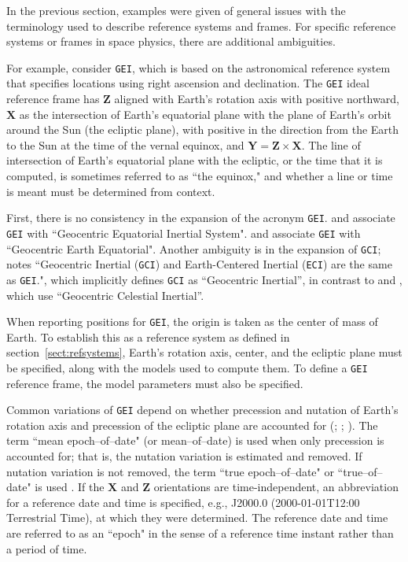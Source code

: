\documentclass[draft]{agujournal2019}
\begin{document}
In the previous section, examples were given of general issues with the terminology used to describe reference systems and frames. For specific reference systems or frames in space physics, there are additional ambiguities.

For example, consider \texttt{GEI}, which is based on the astronomical reference system that specifies locations using right ascension and declination. The \texttt{GEI} ideal reference frame has $\mathbf{Z}$ aligned with Earth's rotation axis with positive northward, $\mathbf{X}$ as the intersection of Earth's equatorial plane with the plane of Earth's orbit around the Sun (the ecliptic plane), with positive in the direction from the Earth to the Sun at the time of the vernal equinox, and $\mathbf{Y}=\mathbf{Z}\times\mathbf{X}$. The line of intersection of Earth's equatorial plane with the ecliptic, or the time that it is computed, is sometimes referred to as ``the equinox," and whether a line or time is meant must be determined from context.

First, there is no consistency in the expansion of the acronym \texttt{GEI}.  and  associate \texttt{GEI} with ``Geocentric Equatorial Inertial System".  and  associate \texttt{GEI} with ``Geocentric Earth Equatorial". Another ambiguity is in the expansion of \texttt{GCI};  notes ``Geocentric Inertial (\texttt{GCI}) and Earth-Centered Inertial (\texttt{ECI}) are the same as \texttt{GEI}.", which implicitly defines \texttt{GCI} as ``Geocentric Inertial'', in contrast to  and
, which use ``Geocentric Celestial Inertial''. 


When reporting positions for \texttt{GEI}, the origin is taken as the center of mass of Earth. To establish this as a reference system as defined in section~\ref{sect:refsystems}, Earth's rotation axis, center, and the ecliptic plane must be specified, along with the models used to compute them. To define a \texttt{GEI} reference frame, the model parameters must also be specified.

Common variations of \texttt{GEI} depend on whether precession and nutation of Earth's rotation axis and precession of the ecliptic plane are accounted for (; ; ). The term ``mean epoch--of--date" (or mean--of--date) is used when only precession is accounted for; that is, the nutation variation is estimated and removed. If nutation variation is not removed, the term ``true epoch--of--date" or ``true--of--date" is used \cite{Hapgood1995}. If the $\mathbf{X}$ and $\mathbf{Z}$ orientations are time-independent, an abbreviation for a reference date and time is specified, e.g., J2000.0 (2000-01-01T12:00 Terrestrial Time), at which they were determined. The reference date and time are referred to as an ``epoch" in the sense of a reference time instant rather than a period of time.
\end{document}
